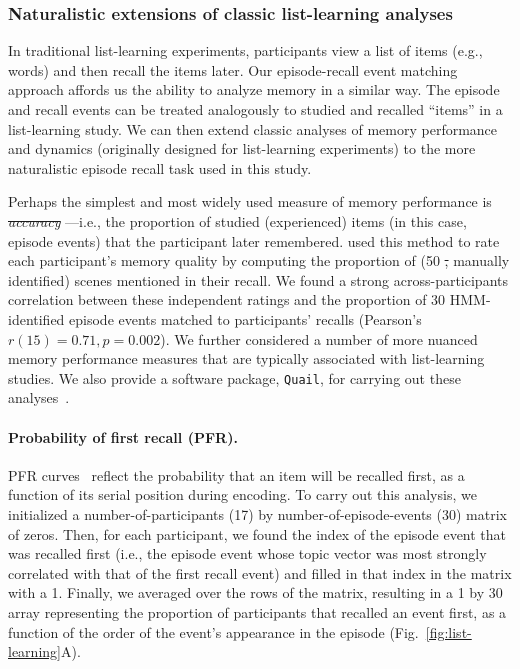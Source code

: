 \documentclass[10pt]{article}
\renewcommand{\includegraphics}[2][]{} %
\providecommand{\DIFaddtex}[1]{{\protect\color{blue}\uwave{#1}}} %
\providecommand{\DIFdeltex}[1]{{\protect\color{red}\sout{#1}}}                      %
\providecommand{\DIFaddbegin}{} %
\providecommand{\DIFaddend}{} %
\providecommand{\DIFdelbegin}{} %
\providecommand{\DIFdelend}{} %
\providecommand{\DIFadd}[1]{\texorpdfstring{\DIFaddtex{#1}}{#1}} %
\providecommand{\DIFdel}[1]{\texorpdfstring{\DIFdeltex{#1}}{}} %
\newcommand{\DIFscaledelfig}{0.5}
\newlength{\DIFdelgraphicswidth} %
\newlength{\DIFdelgraphicsheight} %
\newcommand{\DIFaddincludegraphics}[2][]{{\color{blue}\fbox{\DIFOincludegraphics[#1]{#2}}}} %
\newcommand{\DIFdelincludegraphics}[2][]{%
\sbox{\DIFdelgraphicsbox}{\DIFOincludegraphics[#1]{#2}}%
\settoboxwidth{\DIFdelgraphicswidth}{\DIFdelgraphicsbox} %
\settoboxtotalheight{\DIFdelgraphicsheight}{\DIFdelgraphicsbox} %
\scalebox{\DIFscaledelfig}{%
\parbox[b]{\DIFdelgraphicswidth}{\usebox{\DIFdelgraphicsbox}\\[-\baselineskip] \rule{\DIFdelgraphicswidth}{0em}}\llap{\resizebox{\DIFdelgraphicswidth}{\DIFdelgraphicsheight}{%
\setlength{\unitlength}{\DIFdelgraphicswidth}%
\begin{picture}(1,1)%
\thicklines\linethickness{2pt} %
{\color[rgb]{1,0,0}\put(0,0){\framebox(1,1){}}}%
{\color[rgb]{1,0,0}\put(0,0){\line( 1,1){1}}}%
{\color[rgb]{1,0,0}\put(0,1){\line(1,-1){1}}}%
\end{picture}%
}\hspace*{3pt}}} %
} %
\DeclareRobustCommand{\DIFaddbegin}{\DIFOaddbegin \let\includegraphics\DIFaddincludegraphics} %
\DeclareRobustCommand{\DIFaddend}{\DIFOaddend \let\includegraphics\DIFOincludegraphics} %
\DeclareRobustCommand{\DIFdelbegin}{\DIFOdelbegin \let\includegraphics\DIFdelincludegraphics} %
\DeclareRobustCommand{\DIFdelend}{\DIFOaddend \let\includegraphics\DIFOincludegraphics} %
\begin{document}
\subsubsection*{Naturalistic extensions of classic list-learning analyses}
In traditional list-learning experiments, participants view a list of items (e.g., words) and then recall the items later.  Our episode-recall event matching approach affords us the ability to analyze memory in a similar way. The episode and recall events can be treated analogously to studied and recalled ``items'' in a list-learning study.  We can then extend classic analyses of memory performance and dynamics (originally designed for list-learning experiments) to the more naturalistic episode recall task used in this study.

Perhaps the simplest and most widely used measure of memory performance is \DIFdelbegin \textit{\DIFdel{accuracy}}%
\DIFdelend \DIFaddbegin \DIFadd{``accuracy''}\DIFaddend ---i.e., the proportion of studied (experienced) items (in this case, episode events) that the participant later remembered.  \DIFaddbegin \DIFadd{Chen et al. (2017)~}\DIFaddend \cite{ChenEtal17} used this method to rate each participant's memory quality by computing the proportion of (50 \DIFdelbegin \DIFdel{, }\DIFdelend manually identified) scenes mentioned in their recall.  We found a strong across-participants correlation between these independent ratings and the proportion of 30 HMM-identified episode events matched to participants' recalls (Pearson's $r(15) = 0.71, p = 0.002$).  We further considered a number of more nuanced memory performance measures that are typically associated with list-learning studies.  We also provide a software package, \texttt{Quail}, for carrying out these analyses~\citep{HeusEtal17b}.

\paragraph{Probability of first recall (PFR).}  PFR curves~\citep{WelcBurn24, PostPhil65, AtkiShif68} reflect the probability that an item will be recalled first, as a function of its serial position during encoding. To carry out this analysis, we initialized a number-of-participants (17) by number-of-episode-events (30) matrix of zeros. Then, for each participant, we found the index of the episode event that was recalled first (i.e., the episode event whose topic vector was most strongly correlated with that of the first recall event) and filled in that index in the matrix with a 1.  Finally, we averaged over the rows of the matrix, resulting in a 1 by 30 array representing the proportion of participants that recalled an event first, as a function of the order of the event's appearance in the episode (Fig.~\ref{fig:list-learning}A).
\end{document}
